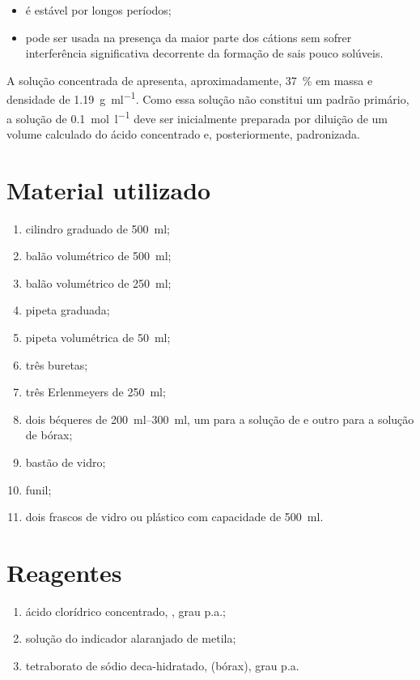 \documentclass[a4paper,12pt]{article}
\begin{document}
\begin{itemize}
    \item é estável por longos períodos;
    \item pode ser usada na presença da maior parte dos cátions sem sofrer interferência significativa decorrente da formação de sais pouco solúveis.
\end{itemize}

A solução concentrada de  apresenta, aproximadamente, \qty{37}{\percent} em massa e densidade de \qty{1.19}{\gram\per\milli\litre}. Como essa solução não constitui um padrão primário, a solução de  \qty{0.1}{\mole\per\litre} deve ser inicialmente preparada por diluição de um volume calculado do ácido concentrado e, posteriormente, padronizada.

\section{Material utilizado}

\begin{enumerate}[label=\alph*.]
    \item cilindro graduado de \qty{500}{\milli\litre};
    \item balão volumétrico de \qty{500}{\milli\litre};
    \item balão volumétrico de \qty{250}{\milli\litre};
    \item pipeta graduada;
    \item pipeta volumétrica de \qty{50}{\milli\litre};
    \item três buretas;
    \item três Erlenmeyers de \qty{250}{\milli\litre};
    \item dois béqueres de \qtyrange{200}{300}{\milli\litre}, um para a solução de  e outro para a solução de bórax;
    \item bastão de vidro;
    \item funil;
    \item dois frascos de vidro ou plástico com capacidade de \qty{500}{\milli\litre}.
\end{enumerate}

\section{Reagentes}

\begin{enumerate}[label=\alph*.]
    \item ácido clorídrico concentrado, , grau p.a.;
    \item solução do indicador alaranjado de metila;
    \item tetraborato de sódio deca-hidratado,  (bórax), grau p.a.
\end{enumerate}
\end{document}
